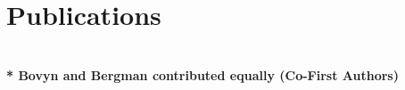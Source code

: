 \documentclass[letterpaper,10pt]{article} %
\begin{document}
\bigskip


\section{Publications}
\bigskip

\begin{description}[itemsep=-1ex]
\item {}
\item {}
\item {}
\item {}
\item {} \\ \textbf{\** Bovyn and Bergman contributed equally (Co-First Authors)}
\item {}
\item {}

%
%
%
%
%

\end{description}
\end{document}
